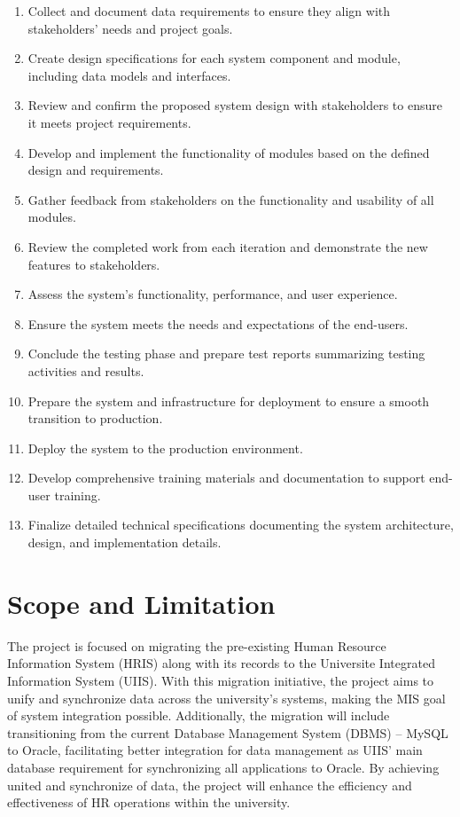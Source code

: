     \begin{enumerate}
        \item Collect and document data requirements to ensure they align with stakeholders' needs and project goals.
        \item Create design specifications for each system component and module, including data models and interfaces.
        \item Review and confirm the proposed system design with stakeholders to ensure it meets project requirements.
        \item Develop and implement the functionality of modules based on the defined design and requirements.

        \item Gather feedback from stakeholders on the functionality and usability of all modules.
        \item Review the completed work from each iteration and demonstrate the new features to stakeholders.
        \item Assess the system's functionality, performance, and user experience.
        \item Ensure the system meets the needs and expectations of the end-users.
        \item Conclude the testing phase and prepare test reports summarizing testing activities and results.
        \item Prepare the system and infrastructure for deployment to ensure a smooth transition to production.
        \item Deploy the system to the production environment.
        \item Develop comprehensive training materials and documentation to support end-user training.
        \item Finalize detailed technical specifications documenting the system architecture, design, and implementation details.
    \end{enumerate}
    
\section{Scope and Limitation}

    The project is focused on migrating the pre-existing Human Resource Information System (HRIS) along with its records to the Universite Integrated Information System (UIIS). With this migration initiative, the project aims to unify and synchronize data across the university's systems, making the MIS goal of system integration possible. Additionally, the migration will include transitioning from the current Database Management System (DBMS) -- MySQL to Oracle, facilitating better integration for data management as UIIS' main database requirement for synchronizing all applications to Oracle. By achieving united and synchronize of data, the project will enhance the efficiency and effectiveness of HR operations within the university.

